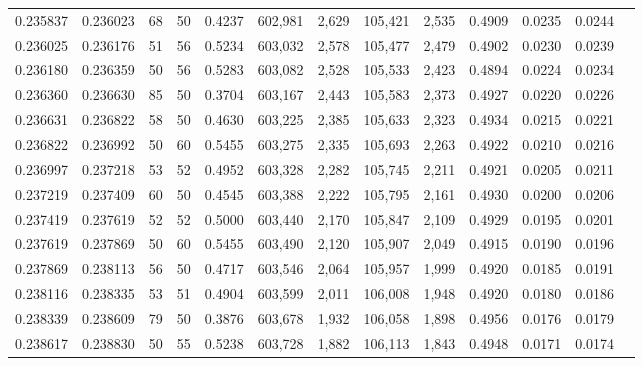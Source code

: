\begin{tabular}{rrrrrrrrrrrrr}
0.235837 & 0.236023 &    68 &  50 &                                     0.4237 & 602,981 &   2,629 & 105,421 &   2,535 & 0.4909 & 0.0235 & 0.0244 \\
0.236025 & 0.236176 &    51 &  56 &                                     0.5234 & 603,032 &   2,578 & 105,477 &   2,479 & 0.4902 & 0.0230 & 0.0239 \\
0.236180 & 0.236359 &    50 &  56 &                                     0.5283 & 603,082 &   2,528 & 105,533 &   2,423 & 0.4894 & 0.0224 & 0.0234 \\
0.236360 & 0.236630 &    85 &  50 &                                     0.3704 & 603,167 &   2,443 & 105,583 &   2,373 & 0.4927 & 0.0220 & 0.0226 \\
0.236631 & 0.236822 &    58 &  50 &                                     0.4630 & 603,225 &   2,385 & 105,633 &   2,323 & 0.4934 & 0.0215 & 0.0221 \\
0.236822 & 0.236992 &    50 &  60 &                                     0.5455 & 603,275 &   2,335 & 105,693 &   2,263 & 0.4922 & 0.0210 & 0.0216 \\
0.236997 & 0.237218 &    53 &  52 &                                     0.4952 & 603,328 &   2,282 & 105,745 &   2,211 & 0.4921 & 0.0205 & 0.0211 \\
0.237219 & 0.237409 &    60 &  50 &                                     0.4545 & 603,388 &   2,222 & 105,795 &   2,161 & 0.4930 & 0.0200 & 0.0206 \\
0.237419 & 0.237619 &    52 &  52 &                                     0.5000 & 603,440 &   2,170 & 105,847 &   2,109 & 0.4929 & 0.0195 & 0.0201 \\
0.237619 & 0.237869 &    50 &  60 &                                     0.5455 & 603,490 &   2,120 & 105,907 &   2,049 & 0.4915 & 0.0190 & 0.0196 \\
0.237869 & 0.238113 &    56 &  50 &                                     0.4717 & 603,546 &   2,064 & 105,957 &   1,999 & 0.4920 & 0.0185 & 0.0191 \\
0.238116 & 0.238335 &    53 &  51 &                                     0.4904 & 603,599 &   2,011 & 106,008 &   1,948 & 0.4920 & 0.0180 & 0.0186 \\
0.238339 & 0.238609 &    79 &  50 &                                     0.3876 & 603,678 &   1,932 & 106,058 &   1,898 & 0.4956 & 0.0176 & 0.0179 \\
0.238617 & 0.238830 &    50 &  55 &                                     0.5238 & 603,728 &   1,882 & 106,113 &   1,843 & 0.4948 & 0.0171 & 0.0174 \\

\end{tabular}
